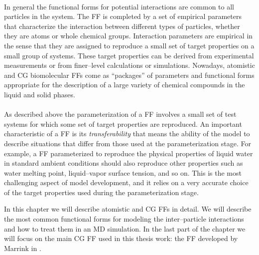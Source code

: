 \paragraph{\textbf{}} In general the functional forms for potential interactions are
common to all particles in the system. The \ac{FF} is completed by a set of empirical parameters that
characterize the interaction between different types of particles, whether they are atoms or whole chemical
groups. Interaction parameters are empirical in the sense that they are assigned to reproduce a small set of
target properties on a small group of systems. These target properties can be derived from experimental
measurements or from finer--level calculations or simulations. Nowadays, atomistic and \ac{CG} biomolecular
\acp{FF} come as ``packages'' of parameters and functional forms appropriate for the description of a large
variety of chemical compounds in the liquid and solid phases.

\paragraph{\textbf{}} As described above the parameterization of a \ac{FF} involves a
small set of test systems for which some set of target properties are reproduced. An important characteristic of 
a \ac{FF} is its \textit{transferability} that means the ability of the model to describe situations that
differ from those used at the parameterization stage. For example, a \ac{FF} parameterized to reproduce the 
physical properties of liquid water in standard ambient conditions should also reproduce other properties such 
as water melting point, liquid--vapor surface tension, and so on. This is the most challenging aspect of model 
development, and it relies on a very accurate choice of the target properties used during the parameterization 
stage.\\\medskip

In this chapter we will describe atomistic and \ac{CG} \acp{FF} in detail. We will describe the most common 
functional forms for modeling the inter--particle interactions and how to treat them in an \ac{MD} simulation. 
In the last part of the chapter we will focus on the main \ac{CG} \ac{FF} used in this thesis work: the 
\martini{} \ac{FF} developed by Marrink \etal{} in \cite{Martini}.

